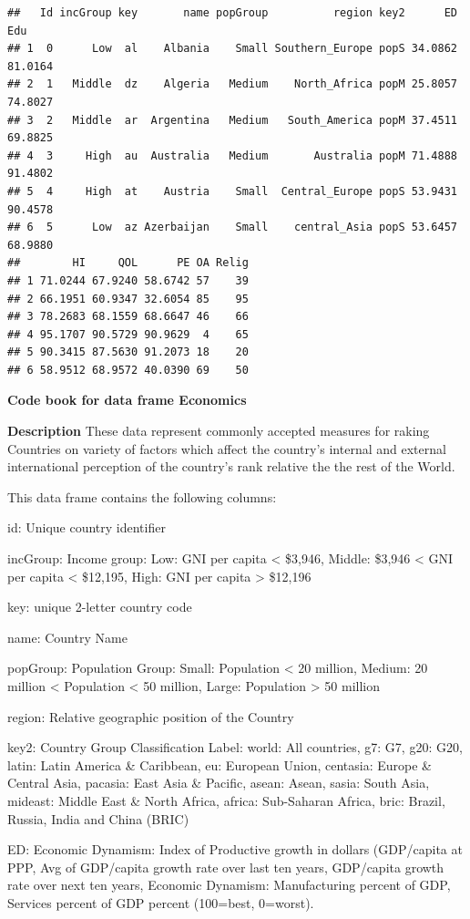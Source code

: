 \documentclass[]{book}
\begin{document}
\begin{verbatim}
##   Id incGroup key       name popGroup          region key2      ED     Edu
## 1  0      Low  al    Albania    Small Southern_Europe popS 34.0862 81.0164
## 2  1   Middle  dz    Algeria   Medium    North_Africa popM 25.8057 74.8027
## 3  2   Middle  ar  Argentina   Medium   South_America popM 37.4511 69.8825
## 4  3     High  au  Australia   Medium       Australia popM 71.4888 91.4802
## 5  4     High  at    Austria    Small  Central_Europe popS 53.9431 90.4578
## 6  5      Low  az Azerbaijan    Small    central_Asia popS 53.6457 68.9880
##        HI     QOL      PE OA Relig
## 1 71.0244 67.9240 58.6742 57    39
## 2 66.1951 60.9347 32.6054 85    95
## 3 78.2683 68.1559 68.6647 46    66
## 4 95.1707 90.5729 90.9629  4    65
## 5 90.3415 87.5630 91.2073 18    20
## 6 58.9512 68.9572 40.0390 69    50
\end{verbatim}

\textbf{Code book for data frame Economics}

\textbf{Description}
These data represent commonly accepted measures for raking Countries on variety of factors which affect the country's internal and external international perception of the country's rank relative the the rest of the World.

This data frame contains the following columns:

id: Unique country identifier

incGroup: Income group: Low: GNI per capita \textless{} \$3,946, Middle: \$3,946 \textless{} GNI per capita \textless{} \$12,195, High: GNI per capita \textgreater{} \$12,196

key: unique 2-letter country code

name: Country Name

popGroup: Population Group: Small: Population \textless{} 20 million, Medium: 20 million \textless{} Population \textless{} 50 million, Large: Population \textgreater{} 50 million

region: Relative geographic position of the Country

key2: Country Group Classification Label: world: All countries, g7: G7, g20: G20, latin: Latin America \& Caribbean, eu: European Union, centasia: Europe \& Central Asia, pacasia: East Asia \& Pacific, asean: Asean, sasia: South Asia, mideast: Middle East \& North Africa, africa: Sub-Saharan Africa, bric: Brazil, Russia, India and China (BRIC)

ED: Economic Dynamism: Index of Productive growth in dollars (GDP/capita at PPP, Avg of GDP/capita growth rate over last ten years, GDP/capita growth rate over next ten years, Economic Dynamism: Manufacturing percent of GDP, Services percent of GDP percent (100=best, 0=worst).
\end{document}
